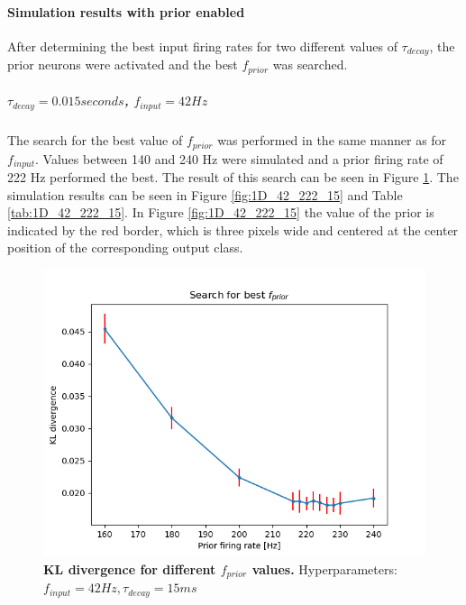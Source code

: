 \paragraph{Simulation results with prior enabled}
After determining the best input firing rates for two different values of $\tau_{decay}$, the prior neurons were activated and the best $f_{prior}$ was searched.
\subparagraph{$\tau_{decay} = 0.015 seconds$, $f_{input} = 42 Hz$}
The search for the best value of $f_{prior}$ was performed in the same manner as for $f_{input}$. Values between 140 and 240 Hz were simulated and a prior firing rate of 222 Hz performed the best. The result of this search can be seen in Figure \ref{fig:1D_KLD_fInput42_tau15}. The simulation results can be seen in Figure \ref{fig:1D_42_222_15} and Table \ref{tab:1D_42_222_15}. In Figure \ref{fig:1D_42_222_15} the value of the prior is indicated by the red border, which is three pixels wide and centered at the center position of the corresponding output class.

\begin{figure}
\centering
  \includegraphics[width=0.75\linewidth]{figures/1D/KLDvsfPrior_fInput42tau15.png}
  \caption{\textbf{KL divergence for different $f_{prior}$ values.} Hyperparameters: $f_{input} = 42 Hz, \tau_{decay} = 15 ms$}
  \label{fig:1D_KLD_fInput42_tau15}
\end{figure}

